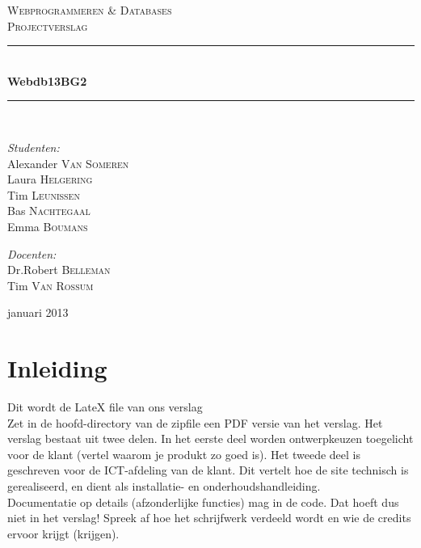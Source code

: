 \documentclass{report}
\newcommand{\HRule}{\rule{\linewidth}{0.5mm}}
\begin{document}
\begin{comment}
Dit is een comment waarin we de voortgang van het verslag kunnen bijhouden. Als je iets update, is het handig als je dat hier even bij zet. Ik (Emma) ben zojuist begonnen aan het verslag. Er is nu een titelpagina.
\end{comment}

\begin{titlepage}
\begin{center}

\textsc{\LARGE Webprogrammeren \& Databases}\\[1.5cm]
\textsc{\Large Projectverslag}\\[0.5cm]

\HRule \\[0.4cm]
{ \huge \bfseries Webdb13BG2}\\[0.4cm]
\HRule \\[1.5cm]

\begin{minipage}{0.4\textwidth}
\begin{flushleft} \large
\emph{Studenten:}\\
Alexander \textsc{Van Someren} \\
Laura \textsc{Helgering} \\
Tim \textsc{Leunissen} \\
Bas \textsc{Nachtegaal} \\
Emma \textsc{Boumans}
\end{flushleft}
\end{minipage}
\begin{minipage}{0.4\textwidth}
\begin{flushright} \large
\emph{Docenten:} \\
Dr.Robert \textsc{Belleman}\\
Tim \textsc{Van Rossum}
\end{flushright}
\end{minipage}

\vfill
{\large januari 2013}

\end{center}
\end{titlepage}

\section{Inleiding}
Dit wordt de LateX file van ons verslag\\
Zet in de hoofd-directory van de zipfile een PDF versie van het verslag. Het verslag bestaat uit twee delen. In het eerste deel worden ontwerpkeuzen toegelicht voor de klant (vertel waarom je produkt zo goed is). Het tweede deel is geschreven voor de ICT-afdeling van de klant. Dit vertelt hoe de site technisch is gerealiseerd, en dient als installatie- en onderhoudshandleiding. \\
Documentatie op details (afzonderlijke functies) mag in de code. Dat hoeft dus niet in het verslag! Spreek af hoe het schrijfwerk verdeeld wordt en wie de credits ervoor krijgt (krijgen). 
\end{document}

